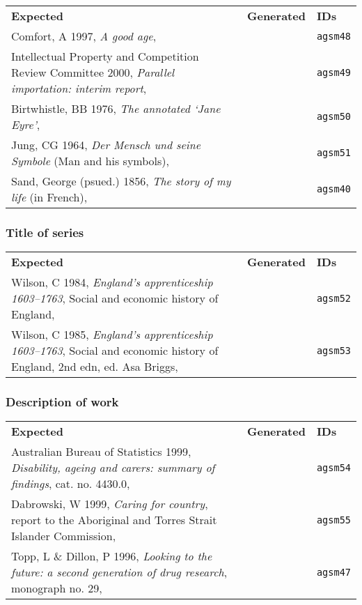\documentclass[a4paper,landscape,12pt]{article}
\newlength\q
\newlength\qr
\newenvironment{citetable}
  {\noindent\begin{longtable}{p{\q} p{\q} p{\qr}}\textbf{Expected} & \textbf{Generated} & \textbf{IDs}\\}
  {\end{longtable}}
\begin{document}
\begin{citetable}
	Comfort, A 1997, \textit{A good age}, & \fullcite{agsm48} & \texttt{agsm48} \\
	Intellectual Property and Competition Review Committee 2000, \textit{Parallel importation: interim report}, & \fullcite{agsm49} & \texttt{agsm49} \\
	Birtwhistle, BB 1976, \textit{The annotated `Jane Eyre'}, & \fullcite{agsm50} & \texttt{agsm50} \\
	Jung, CG 1964, \textit{Der Mensch und seine Symbole} (Man and his symbols), & \fullcite{agsm51} & \texttt{agsm51} \\
	Sand, George (psued.) 1856, \textit{The story of my life} (in French), & \fullcite{agsm40} & \texttt{agsm40} \\
\end{citetable}

\subsubsection{Title of series}

\begin{citetable}
	Wilson, C 1984, \textit{England's apprenticeship 1603--1763}, Social and economic history of England, & \fullcite{agsm52} & \texttt{agsm52} \\
	Wilson, C 1985, \textit{England's apprenticeship 1603--1763}, Social and economic history of England, 2nd edn, ed. Asa Briggs, & \fullcite{agsm53} & \texttt{agsm53} \\
\end{citetable}

\subsubsection{Description of work}

\begin{citetable}
	Australian Bureau of Statistics 1999, \textit{Disability, ageing and carers: summary of findings}, cat. no. 4430.0, & \fullcite{agsm54} & \texttt{agsm54} \\
	Dabrowski, W 1999, \textit{Caring for country}, report to the Aboriginal and Torres Strait Islander Commission, & \fullcite{agsm55} & \texttt{agsm55} \\
	Topp, L \& Dillon, P 1996, \textit{Looking to the future: a second generation of drug research}, monograph no. 29, & \fullcite{agsm47} & \texttt{agsm47} \\
\end{citetable}
\end{document}
